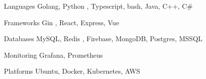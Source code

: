 

\begin{cvskills}

  \cvskill
    {Languages} %
    {Golang, Python} %
    {, Typescript, bash, Java, C++, C\#} %

  \cvskill
    {Frameworks} %
    {Gin} %
    {, React, Express, Vue} %

  \cvskill
    {Databases} %
    {MySQL, Redis} %
    {, Firebase, MongoDB, Postgres, MSSQL} %

  \cvskill
    {Monitoring} %
    {} %
    {Grafana, Prometheus} %

  \cvskill
    {Platforms} %
    {} %
    {Ubuntu, Docker, Kubernetes, AWS} %

\end{cvskills}
